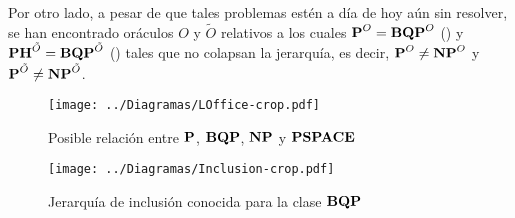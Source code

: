 Por otro lado, a pesar de que tales problemas estén a día de hoy aún sin resolver, se han encontrado oráculos $O$ y $\tilde{O}$ relativos a los cuales $\operatorname{\mathbf{P}}^O=\operatorname{\mathbf{BQP}}^O$ (\cite{FORTNOW1999240}) y $\operatorname{\mathbf{PH}}^{\tilde{O}}=\operatorname{\mathbf{BQP}}^{\tilde{O}}$ (\cite{raz2018oracle}) tales que no colapsan la jerarquía, es decir, $\operatorname{\mathbf{P}}^O\neq \operatorname{\mathbf{NP}}^O$ y $\operatorname{\mathbf{P}}^{\tilde{O}}\neq \operatorname{\mathbf{NP}}^{\tilde{O}}$.

%
%

\begin{minipage}{\linewidth}
      \centering
      \begin{minipage}{0.45\linewidth}
          \begin{figure}[H]
			\begin{center}
				\texttt{[image: ../Diagramas/LOffice-crop.pdf]}
			\end{center}
			\caption{Posible relación entre $\operatorname{\mathbf{P}}$, $\operatorname{\mathbf{BQP}}$, $\operatorname{\mathbf{NP}}$ y $\operatorname{\mathbf{PSPACE}}$}
		\end{figure}
      \end{minipage}
      \hspace{0.05\linewidth}
      \begin{minipage}{0.45\linewidth}
          \begin{figure}[H]
			\begin{center}
				\texttt{[image: ../Diagramas/Inclusion-crop.pdf]}
			\end{center}
			\caption{Jerarquía de inclusión conocida para la clase $\operatorname{\mathbf{BQP}}$}
		\end{figure}
      \end{minipage}
  \end{minipage}

